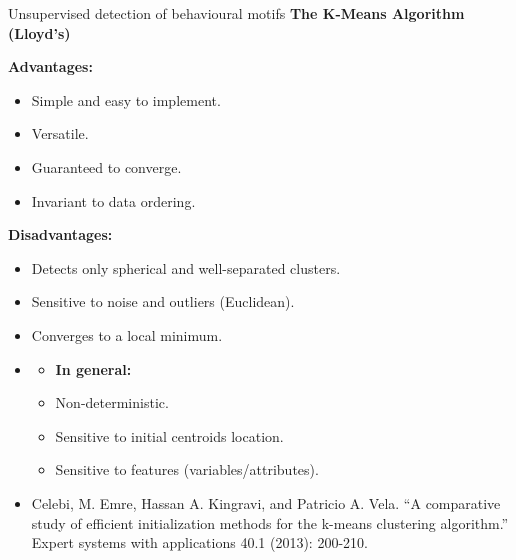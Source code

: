 \documentclass{beamer}
\newlength{\tmpShadow}
\newcommand{\MyShadow}[2]{%
	\settowidth{\tmpShadow}{#1}
	\addtolength{\tmpShadow}{.1em}
	\raisebox{-0.25ex}{\textcolor{gray!70}{#1}}%
	\kern-\tmpShadow%
	\textcolor{#2}{#1}%
}
\begin{document}
{\begin{frame}{Unsupervised detection of behavioural motifs}
\textbf{The K-Means Algorithm (Lloyd's)}
\begin{multicols}{2}
	\textbf{Advantages:}
	\begin{itemize}[label={\MyShadow{$\bullet$}{blue!80}}, leftmargin=*]
		\item Simple and easy to implement.
		\item Versatile.
		\item Guaranteed to converge. 
		\item Invariant to data ordering.			
	\end{itemize}
	\columnbreak 
	\textbf{Disadvantages:}
	\begin{itemize}[label={\MyShadow{$\bullet$}{red!80}}, leftmargin=*]
		\item Detects only spherical and well-separated clusters.
		\item Sensitive to noise and outliers (Euclidean).
		\item Converges to a local minimum. 			
	\end{itemize}			
\end{multicols}
\begin{itemize}[leftmargin=*]
	\item<2->
	\begin{tcolorbox}[colback=white!5,colframe=red]
	\begin{itemize}[leftmargin=*]
		\item \textbf{In general:}
	\end{itemize}
	\begin{itemize}[label={\MyShadow{$\bullet$}{green!80}}, leftmargin=*]
		\item Non-deterministic.	
		\item Sensitive to initial centroids location.
		\item Sensitive to features (variables/attributes).			
	\end{itemize}
	\end{tcolorbox}
\end{itemize}
\vspace{0.3cm}
\begin{itemize}[leftmargin=*]
	\item[]\tiny{Celebi, M. Emre, Hassan A. Kingravi, and Patricio A. Vela. ``A comparative study of efficient initialization methods for the k-means clustering algorithm.'' Expert systems with applications 40.1 (2013): 200-210.}	
\end{itemize}	
\end{frame}


}
\end{document}
